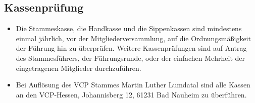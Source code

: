 \documentclass[a4paper]{article}
\begin{document}
    \subsection{Kassenprüfung} %
    \label{sub:kassenprufung}
	\begin{itemize}
		\item Die Stammeskasse, die Handkasse und die Sippenkassen sind mindestens einmal jährlich, vor der Mitgliederversammlung, auf die Ordnungsmäßigkeit der Führung hin zu überprüfen. Weitere Kassenprüfungen sind auf Antrag des Stammesführers, der Führungsrunde, oder der einfachen Mehrheit der eingetragenen Mitglieder durchzuführen. 
        \item Bei Auflösung des VCP Stammes Martin Luther Lumdatal sind alle Kassen an den VCP-Hessen, Johannisberg 12, 61231 Bad Nauheim zu überführen.
     \end{itemize}
\end{document}
